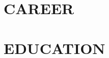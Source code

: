 \documentclass[a4paper]{deedy-resume-openfont}
\begin{document}
\begin{minipage}[t]{0.67\textwidth} 

\section{CAREER}





\section{EDUCATION}





\end{minipage}
\end{document}
